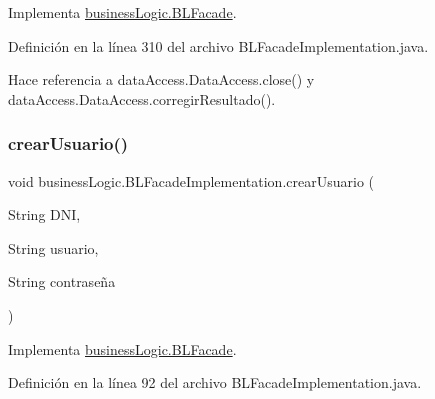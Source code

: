 Implementa \mbox{\hyperlink{interfacebusinessLogic_1_1BLFacade_ac643520df65287794056938207db059f}{business\+Logic.\+B\+L\+Facade}}.



Definición en la línea 310 del archivo B\+L\+Facade\+Implementation.\+java.


\begin{DoxyCode}{0}

\end{DoxyCode}


Hace referencia a data\+Access.\+Data\+Access.\+close() y data\+Access.\+Data\+Access.\+corregir\+Resultado().

\mbox{\label{classbusinessLogic_1_1BLFacadeImplementation_a2127be166dc2d3c992f3435006ab0575}} 
\subsubsection{\texorpdfstring{crearUsuario()}{crearUsuario()}}
{\footnotesize\ttfamily void business\+Logic.\+B\+L\+Facade\+Implementation.\+crear\+Usuario (\begin{DoxyParamCaption}\item[{String}]{D\+NI,  }\item[{String}]{usuario,  }\item[{String}]{contraseña }\end{DoxyParamCaption})}



Implementa \mbox{\hyperlink{interfacebusinessLogic_1_1BLFacade_ad5ddf0ebb395d8d4d8574ccb9cc4047e}{business\+Logic.\+B\+L\+Facade}}.



Definición en la línea 92 del archivo B\+L\+Facade\+Implementation.\+java.


